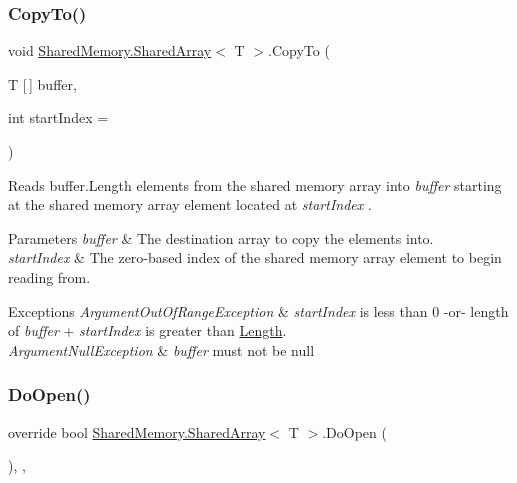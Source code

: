\subsubsection{\texorpdfstring{Copy\+To()}{CopyTo()}}
{\footnotesize\ttfamily void \hyperlink{class_shared_memory_1_1_shared_array}{Shared\+Memory.\+Shared\+Array}$<$ T $>$.Copy\+To (\begin{DoxyParamCaption}\item[{T \mbox{[}$\,$\mbox{]}}]{buffer,  }\item[{int}]{start\+Index = {} }\end{DoxyParamCaption})\hspace{0.3cm}{\ttfamily [inline]}}



Reads buffer.\+Length elements from the shared memory array into {\itshape buffer}  starting at the shared memory array element located at {\itshape start\+Index} . 


\begin{DoxyParams}{Parameters}
{\em buffer} & The destination array to copy the elements into.\\
\hline
{\em start\+Index} & The zero-\/based index of the shared memory array element to begin reading from.\\
\hline
\end{DoxyParams}

\begin{DoxyExceptions}{Exceptions}
{\em Argument\+Out\+Of\+Range\+Exception} & {\itshape start\+Index}  is less than 0 -\/or-\/ length of {\itshape buffer}  + {\itshape start\+Index}  is greater than \hyperlink{class_shared_memory_1_1_shared_array_a0fc7647fef708e12caf94e7be58f2c3c}{Length}.\\
\hline
{\em Argument\+Null\+Exception} & {\itshape buffer}  must not be null\\
\hline
\end{DoxyExceptions}
\mbox{\label{class_shared_memory_1_1_shared_array_ac6a9a9606b9287538a148eb3175f7562}} 
\subsubsection{\texorpdfstring{Do\+Open()}{DoOpen()}}
{\footnotesize\ttfamily override bool \hyperlink{class_shared_memory_1_1_shared_array}{Shared\+Memory.\+Shared\+Array}$<$ T $>$.Do\+Open (\begin{DoxyParamCaption}{ }\end{DoxyParamCaption})\hspace{0.3cm}{\ttfamily [inline]}, {\ttfamily [protected]}, {\ttfamily [virtual]}}



